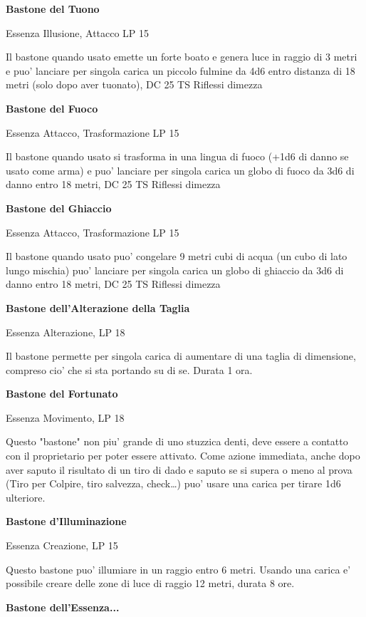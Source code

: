\documentclass[a4paper,11pt,twoside,openany]{book}
\begin{document}
{\textbf{Bastone del Tuono}

Essenza Illusione, Attacco LP 15

Il bastone quando usato emette un forte boato e genera luce in raggio di 3 metri e puo' lanciare per singola carica un piccolo fulmine da 4d6 entro distanza di 18 metri (solo dopo aver tuonato), DC 25 TS Riflessi dimezza

\textbf{Bastone del Fuoco}

Essenza Attacco, Trasformazione LP 15

Il bastone quando usato si trasforma in una lingua di fuoco (+1d6 di danno se usato come arma) e puo' lanciare per singola carica un globo di fuoco da 3d6 di danno entro 18 metri, DC 25 TS Riflessi dimezza

\textbf{Bastone del Ghiaccio}

Essenza Attacco, Trasformazione LP 15

Il bastone quando usato puo' congelare 9 metri cubi di acqua (un cubo di lato lungo mischia) puo' lanciare per singola carica un globo di ghiaccio da 3d6 di danno entro 18 metri, DC 25 TS Riflessi dimezza 

\textbf{Bastone dell'Alterazione della Taglia}

Essenza Alterazione, LP 18

Il bastone permette per singola carica di aumentare di una taglia di dimensione, compreso cio' che si sta portando su di se. Durata 1 ora.

\textbf{Bastone del Fortunato}

Essenza Movimento, LP 18

Questo "bastone" non piu' grande di uno stuzzica denti, deve essere a contatto con il proprietario per poter essere attivato. Come azione immediata, anche dopo aver saputo il risultato di un tiro di dado e saputo se si supera o meno al prova (Tiro per Colpire, tiro salvezza, check\ldots ) puo' usare una carica per tirare 1d6 ulteriore.

\textbf{Bastone d'Illuminazione}

Essenza Creazione, LP 15

Questo bastone puo' illumiare in un raggio entro 6 metri. Usando una carica e' possibile creare delle zone di luce di raggio 12 metri, durata 8 ore.

\textbf{Bastone dell'Essenza...}

}
\end{document}
